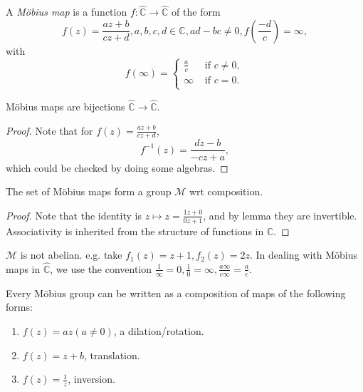 \documentclass[a4paper]{article}
\begin{document}
    \begin{definition}
        A \textit{M\"{o}bius map} is a function $ f: \hat{\mathbb{C}}\to \hat{\mathbb{C}} $ of the form
        \[
            f(z)=\frac{az+b}{cz+d}, a,b,c,d\in \mathbb{C}, ad-bc\neq 0, f\left( \frac{-d}{c} \right)=\infty
        ,\]
        with
        \[
            f(\infty)=\begin{cases}
            \frac{a}{c} &\text{ if } c\neq 0,\\
            \infty &\text{ if } c=0.\\
            \end{cases} 
        \]
    \end{definition}
    \begin{lemma}\label{lma:mobius are bijections}
        M\"{o}bius maps are bijections $ \hat{\mathbb{C}}\to \hat{\mathbb{C}} $.
    \end{lemma}
    \begin{proof}
        Note that for $ f(z)=\frac{az+b}{cz+d} $, 
        \[
            f^{-1}(z)=\frac{dz-b}{-cz+a}
        ,\]
        which could be checked by doing some algebras.
    \end{proof}
    \begin{theorem}\label{thm:mobius_group}
        The set of M\"{o}bius maps form a group $ \mathcal{M} $ wrt composition.
    \end{theorem}
    \begin{proof}
        Note that the identity is $z\mapsto z=\frac{1z+0}{0z+1}$, and by lemma they are invertible. Associativity  is inherited from the structure of functions in $ \mathbb{C} $. 
    \end{proof}
    \begin{remark}
        $\mathcal{M}$ is not abelian. e.g. take $ f_1(z)=z+1, f_2(z)=2z $. In dealing with M\"{o}bius maps in $ \hat{\mathbb{C}} $, we use the convention $ \frac{1}{\infty}=0, \frac{1}{0}=\infty, \frac{a\infty}{c\infty}=\frac{a}{c} $.
    \end{remark}
    \begin{proposition}\label{prop:decomp_mobius}
        Every M\"{o}bius group can be written as a composition of maps of the following forms:
        \begin{enumerate}[(1)]
            \item $ f(z)=az(a\neq 0) $, a dilation/rotation.
            \item $ f(z)=z+b $, translation.
            \item $ f(z)=\frac{1}{z} $, inversion.
        \end{enumerate}
    \end{proposition}
\end{document}
